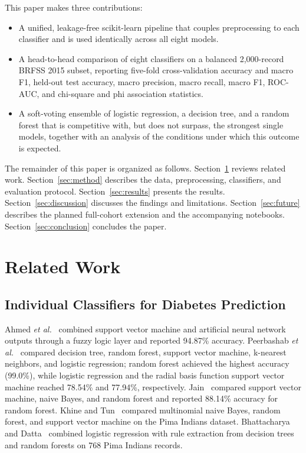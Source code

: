 \documentclass[conference]{IEEEtran}
\begin{document}
This paper makes three contributions:
\begin{itemize}
\item A unified, leakage-free scikit-learn pipeline that couples preprocessing to each classifier and is used identically across all eight models.
\item A head-to-head comparison of eight classifiers on a balanced 2,000-record BRFSS 2015 subset, reporting five-fold cross-validation accuracy and macro F1, held-out test accuracy, macro precision, macro recall, macro F1, ROC-AUC, and chi-square and phi association statistics.
\item A soft-voting ensemble of logistic regression, a decision tree, and a random forest that is competitive with, but does not surpass, the strongest single models, together with an analysis of the conditions under which this outcome is expected.
\end{itemize}

The remainder of this paper is organized as follows. Section~\ref{sec:related} reviews related work. Section~\ref{sec:method} describes the data, preprocessing, classifiers, and evaluation protocol. Section~\ref{sec:results} presents the results. Section~\ref{sec:discussion} discusses the findings and limitations. Section~\ref{sec:future} describes the planned full-cohort extension and the accompanying notebooks. Section~\ref{sec:conclusion} concludes the paper.

\section{Related Work}
\label{sec:related}

\subsection{Individual Classifiers for Diabetes Prediction}

Ahmed \textit{et al.}~\cite{ahmed2022ieee} combined support vector machine and artificial neural network outputs through a fuzzy logic layer and reported 94.87\% accuracy. Peerbashab \textit{et al.}~\cite{peerbashab2023} compared decision tree, random forest, support vector machine, k-nearest neighbors, and logistic regression; random forest achieved the highest accuracy (99.0\%), while logistic regression and the radial basis function support vector machine reached 78.54\% and 77.94\%, respectively. Jain~\cite{jain2022ieee} compared support vector machine, naive Bayes, and random forest and reported 88.14\% accuracy for random forest. Khine and Tun~\cite{khine2024ieee} compared multinomial naive Bayes, random forest, and support vector machine on the Pima Indians dataset. Bhattacharya and Datta~\cite{bhattacharya2023ieee} combined logistic regression with rule extraction from decision trees and random forests on 768 Pima Indians records.
\end{document}
